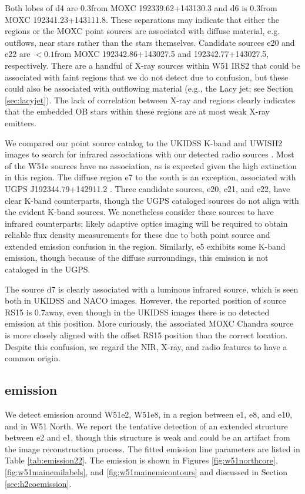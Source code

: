 Both lobes of d4 are
0.3\arcsec from MOXC 192339.62+143130.3 and d6 is 0.3\arcsec from MOXC
192341.23+143111.8.    These
separations may indicate that either the \hii regions or the MOXC point sources
are associated with diffuse material, e.g. outflows,
near stars rather than the stars themselves.  
Candidate sources e20 and e22 are $<0.1$\arcsec from
MOXC 192342.86+143027.5 and 192342.77+143027.5, respectively.
There are a handful of X-ray
sources within W51 IRS2 that could be associated with faint \hchii regions that
we do not detect due to confusion, but these could also be associated with
outflowing material (e.g., the Lacy jet; see Section \ref{sec:lacyjet}).  The
lack of correlation between X-ray and \hchii regions clearly indicates that the
embedded OB stars within these \hchii regions are at most weak X-ray emitters.  

We compared our point source catalog to the UKIDSS K-band and UWISH2 \hh images
to search for infrared associations with our detected radio sources
\citep{Lucas2008a,Froebrich2011a}.  Most of the W51e sources have no
association, as is expected given the high extinction in this region.  The
diffuse region e7 to the south is an exception, associated with UGPS
J192344.79+142911.2 \citep{Lucas2008a}.  Three candidate sources, e20, e21, and
e22, have clear K-band counterparts, though the UGPS cataloged sources do not
align with the evident K-band sources. We nonetheless consider these sources
to have infrared counterparts; likely adaptive optics imaging will be required
to obtain reliable flux density measurements for these due to both point source
and extended emission confusion in the region.   Similarly, e5 exhibits some
K-band emission, though because of the diffuse surroundings, this emission is
not cataloged in the UGPS.

The source d7 is clearly associated with a luminous infrared source, which is
seen both in UKIDSS \citep{Lucas2008a} and NACO \citep{Figueredo2008a} images.
However, the reported position of \citet{Goldader1994a} source RS15 is
0.7\arcsec away, even though in the UKIDSS images there is no detected emission
at this position.  More curiously, the associated MOXC Chandra source
\citep{Townsley2014a} is more closely aligned with the offset RS15 position
than the correct location.  Despite this confusion, we regard the NIR, X-ray,
and radio features to have a common origin.


\subsection{\formaldehyde \twotwo emission}
\label{sec:twotwoemission}
We detect \formaldehyde \twotwo emission around W51e2, W51e8, in a region
between e1, e8, and e10, and in W51 North.  We report the tentative detection
of an extended structure between e2 and e1, though this structure is weak
and could be an artifact from the image reconstruction process.  The fitted
emission line parameters are listed in Table \ref{tab:emission22}.  The
emission is shown in Figures \ref{fig:w51northcore},
\ref{fig:w51mainemilabels}, and \ref{fig:w51mainemicontours} and discussed in
Section \ref{sec:h2coemission}.

